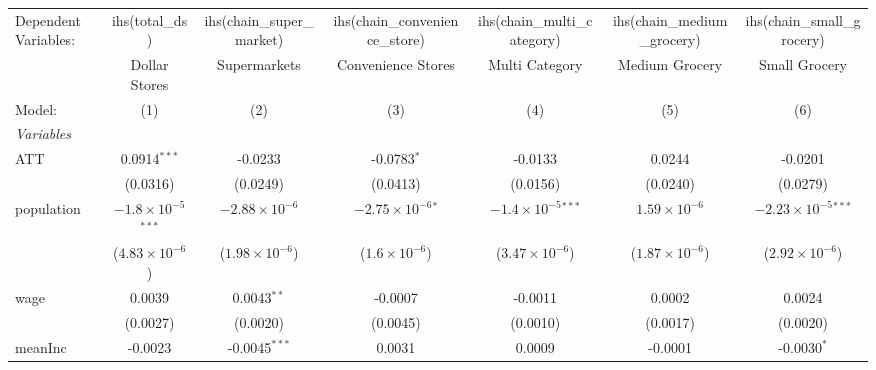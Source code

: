 \begingroup
\centering
\begin{tabular}{lcccccc}
   \tabularnewline \midrule \midrule
   Dependent Variables: & ihs(total\_ds)                & ihs(chain\_super\_market)   & ihs(chain\_convenience\_store)   & ihs(chain\_multi\_category)   & ihs(chain\_medium\_grocery)   & ihs(chain\_small\_grocery)\\    
                        & Dollar Stores                 & Supermarkets                & Convenience Stores               & Multi Category                & Medium Grocery                & Small Grocery \\   
   Model:               & (1)                           & (2)                         & (3)                              & (4)                           & (5)                           & (6)\\  
   \midrule
   \emph{Variables}\\
   ATT                  & 0.0914$^{***}$                & -0.0233                     & -0.0783$^{*}$                    & -0.0133                       & 0.0244                        & -0.0201\\   
                        & (0.0316)                      & (0.0249)                    & (0.0413)                         & (0.0156)                      & (0.0240)                      & (0.0279)\\   
   population           & $-1.8\times 10^{-5}$$^{***}$  & $-2.88\times 10^{-6}$       & $-2.75\times 10^{-6}$$^{*}$      & $-1.4\times 10^{-5}$$^{***}$  & $1.59\times 10^{-6}$          & $-2.23\times 10^{-5}$$^{***}$\\    
                        & ($4.83\times 10^{-6}$)        & ($1.98\times 10^{-6}$)      & ($1.6\times 10^{-6}$)            & ($3.47\times 10^{-6}$)        & ($1.87\times 10^{-6}$)        & ($2.92\times 10^{-6}$)\\    
   wage                 & 0.0039                        & 0.0043$^{**}$               & -0.0007                          & -0.0011                       & 0.0002                        & 0.0024\\   
                        & (0.0027)                      & (0.0020)                    & (0.0045)                         & (0.0010)                      & (0.0017)                      & (0.0020)\\   
   meanInc              & -0.0023                       & -0.0045$^{***}$             & 0.0031                           & 0.0009                        & -0.0001                       & -0.0030$^{*}$\\   

\end{tabular}
